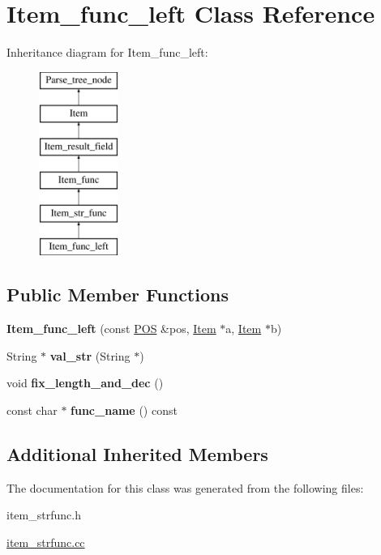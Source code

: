 \hypertarget{classItem__func__left}{}\section{Item\+\_\+func\+\_\+left Class Reference}
\label{classItem__func__left}
Inheritance diagram for Item\+\_\+func\+\_\+left\+:\begin{figure}[H]
\begin{center}
\leavevmode
\includegraphics[height=6.000000cm]{classItem__func__left}
\end{center}
\end{figure}
\subsection*{Public Member Functions}
\begin{DoxyCompactItemize}
\item 
\mbox{\label{classItem__func__left_a38579f256505f778f63e28fa40c13ad7}} 
{\bfseries Item\+\_\+func\+\_\+left} (const \mbox{\hyperlink{structYYLTYPE}{P\+OS}} \&pos, \mbox{\hyperlink{classItem}{Item}} $\ast$a, \mbox{\hyperlink{classItem}{Item}} $\ast$b)
\item 
\mbox{\label{classItem__func__left_a77f1ba486928ea8864a91d1420103180}} 
String $\ast$ {\bfseries val\+\_\+str} (String $\ast$)
\item 
\mbox{\label{classItem__func__left_a9c06de8cd8414cbb1010b9a9702990d7}} 
void {\bfseries fix\+\_\+length\+\_\+and\+\_\+dec} ()
\item 
\mbox{\label{classItem__func__left_a07f6ac2f0ade1b227ddd0b9356ab6993}} 
const char $\ast$ {\bfseries func\+\_\+name} () const
\end{DoxyCompactItemize}
\subsection*{Additional Inherited Members}


The documentation for this class was generated from the following files\+:\begin{DoxyCompactItemize}
\item 
item\+\_\+strfunc.\+h\item 
\mbox{\hyperlink{item__strfunc_8cc}{item\+\_\+strfunc.\+cc}}\end{DoxyCompactItemize}

